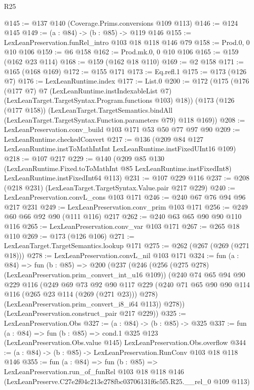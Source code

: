 \begin{lexlean}{R25}
\begin{coremodule}
@145 := @137 @140 (Coverage.Prims.conversions @109 @113)
@146 := @124 @145
@149 := (a : @84) -> (b : @85) -> @119 @146
@155 := LexLeanPreservation.funRel_intro @103 @18 @118 @146 @79
@158 := Prod.{0, 0} @10 @106
@159 := @6 @158
@162 := Prod.mk.{0, 0} @10 @106
@165 := @159 (@162 @23 @114)
@168 := @159 (@162 @18 @110)
@169 := @2 @158
@171 := @165 (@168 @169)
@172 := @155 @171
@173 := Eq.refl.{1}
@175 := @173 (@126 @7)
@176 := LexLeanRuntime.index
@177 := List.{0}
@200 := @172
    (@175
      (@176
        (@177 @7)
        @7
        (LexLeanRuntime.instIndexableList @7)
        (LexLeanTarget.TargetSyntax.Program.functions @103)
        @18))
    (@173
      (@126 (@177 @158))
      (LexLeanTarget.TargetSemantics.bindAll
        (LexLeanTarget.TargetSyntax.Function.parameters @79)
        @118
        @169))
@208 := LexLeanPreservation.conv_build @103 @171 @53 @50 @77 @97 @90
@209 := LexLeanRuntime.checkedConvert
@217 := @136 (@209 @84 @127 LexLeanRuntime.instToMathIntInt LexLeanRuntime.instFixedUInt16 @109)
@218 := @107 @217
@229 := @140
    (@209
      @85
      @130
      (LexLeanRuntime.Fixed.toToMathInt @85 LexLeanRuntime.instFixedInt8)
      LexLeanRuntime.instFixedInt64
      @113)
@231 := @107 @229 @116
@237 := @208 (@218 @231) (LexLeanTarget.TargetSyntax.Value.pair @217 @229)
@240 := LexLeanPreservation.convL_cons @103 @171
@246 := @240 @67 @76 @94 @96 @217 @231
@249 := LexLeanPreservation.conv_prim @103 @171
@256 := @249 @60 @66 @92 @90 (@111 @116) @217
@262 := @240 @63 @65 @90 @90 @110 @116
@265 := LexLeanPreservation.conv_var @103 @171
@267 := @265 @18 @110
@269 := @173 (@126 @106)
@271 := LexLeanTarget.TargetSemantics.lookup @171
@275 := @262 (@267 (@269 (@271 @18)))
@278 := LexLeanPreservation.convL_nil @103 @171
@324 := fun (a : @84) =>
  fun (b : @85) =>
  @200
    (@237
      (@246
        (@256 (@275 @278) (LexLeanPreservation.prim_convert_int_u16 @109))
        (@240
          @74
          @65
          @94
          @90
          @229
          @116
          (@249
            @69
            @73
            @92
            @90
            @117
            @229
            (@240 @71 @65 @90 @90 @114 @116 (@265 @23 @114 (@269 (@271 @23))) @278)
            (LexLeanPreservation.prim_convert_i8_i64 @113))
          @278))
      (LexLeanPreservation.construct_pair @217 @229))
@325 := LexLeanPreservation.Obs
@327 := (a : @84) -> (b : @85) -> @325
@337 := fun (a : @84) =>
  fun (b : @85) =>
  cond.{1} @325 @123 (LexLeanPreservation.Obs.value @145) LexLeanPreservation.Obs.overflow
@344 := (a : @84) -> (b : @85) -> LexLeanPreservation.RunConv @103 @18 @118 @146
@355 := fun (a : @84) =>
  fun (b : @85) =>
  LexLeanPreservation.run_of_funRel
    @103
    @18
    @118
    @146
    (LexLeanPreserve.C27e2f04c213e278fbc03706131f6c5f5.R25.__rel_0 @109 @113)
\end{coremodule}
\end{lexlean}
